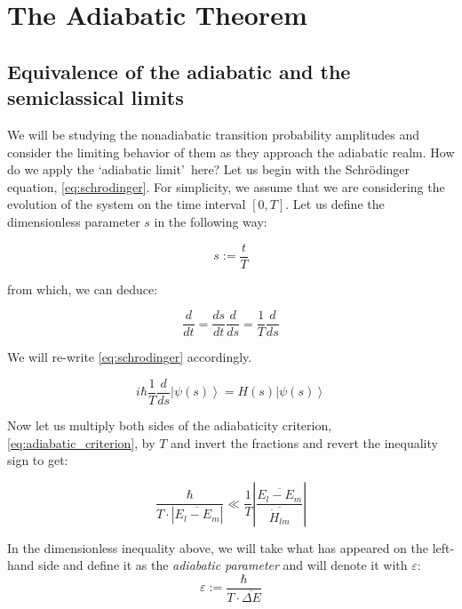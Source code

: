 \documentclass[12pt,a4paper]{article}
\begin{document}
	\section{The Adiabatic Theorem}
	\label{sec:adiabatic_theorem}
	
	\subsection{Equivalence of the adiabatic and the semiclassical limits}
	\label{subsec:equivalence}
	
	We will be studying the nonadiabatic transition probability amplitudes and consider the limiting behavior of them as they approach the adiabatic realm. How do we apply the \textquoteleft adiabatic limit\textquoteright\, here? Let us begin with the Schr\"{o}dinger equation, \eqref{eq:schrodinger}. For simplicity, we assume that we are considering the evolution of the system on the time interval $\left[ 0, T \right]$. Let us define the dimensionless parameter $s$ in the following way:
	
	\begin{equation}
		s := \dfrac{t}{T}
		\label{eq:dimensionless_time}
	\end{equation}
	
	from which, we can deduce:
	
	\begin{equation}
		\dfrac{d}{dt} = \dfrac{ds}{dt} \dfrac{d}{ds} = \dfrac{1}{T} \dfrac{d}{ds}
		\label{eq:derivative_transform}
	\end{equation}
	
	We will re-write \eqref{eq:schrodinger} accordingly.
	
	\begin{equation}
		i \hbar \dfrac{1}{T} \dfrac{d}{ds} \left| \psi(s) \right\rangle = H(s) \left| \psi(s) \right\rangle
		\label{eq:schrodinger_scaled}
	\end{equation}
	
	Now let us multiply both sides of the adiabaticity criterion, \eqref{eq:adiabatic_criterion}, by $T$ and invert the fractions and revert the inequality sign to get:
	
	\begin{equation}
		\frac{\hbar}{ T \cdot \left| \overline{E_{l} - E_{m}} \right|} \ll \dfrac{1}{T} \left| \dfrac{\overline{E_{l} - E_{m}}}{\overline{\dot{H}_{lm}}} \right|
		\label{eq:adiabatic_epsilon}
	\end{equation}
	
	In the dimensionless inequality above, we will take what has appeared on the left-hand side and define it as the \emph{adiabatic parameter} and will denote it with $\varepsilon$:
	\begin{equation}
		\varepsilon := \frac{\hbar}{ T \cdot \overline{\Delta E}}
		\label{eq:epsilon_definition}
	\end{equation}
	
\end{document}
